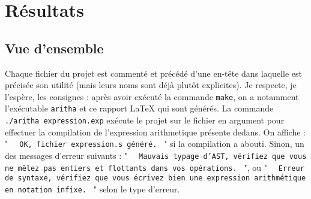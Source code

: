 \documentclass[12pt,french]{article}
\newcommand{\inlinecode}[1]{%
  \texttt{%
    \setlength{\spaceskip}{0.5em plus 1em minus 0.1em}%
    \ifdim\lastskip>0pt \unskip\hspace{0.5em plus 0.5em minus 0.1em}\fi
    #1
  }%
}
\begin{document}
\section{Résultats}
\subsection{Vue d'ensemble}
Chaque fichier du projet est commenté et précédé d'une en-tête dans laquelle est précisée son utilité (mais leurs noms sont déjà plutôt explicites). Je respecte, je l'espère, les consignes : après avoir exécuté la commande \texttt{make}, on a notamment l'exécutable \texttt{aritha} et ce rapport {\LaTeX}  qui sont générés. La commande \texttt{./aritha expression.exp} exécute le projet sur le fichier en argument pour effectuer la compilation de l'expression arithmetique présente dedans. On affiche  : "\inlinecode{OK, fichier expression.s généré.}" si la compilation a abouti. Sinon, un des messages d'erreur suivants : "\inlinecode{Mauvais typage d'AST, vérifiez que vous ne mêlez pas entiers et flottants dans vos opérations.}", ou "\inlinecode{Erreur de syntaxe, vérifiez que vous écrivez bien une expression arithmétique en notation infixe.}" selon le type d'erreur.
\end{document}
